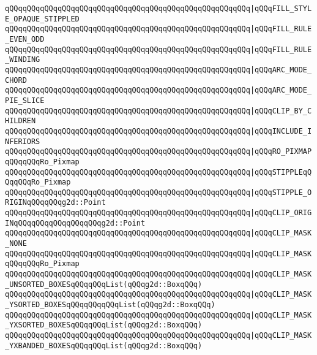 \verb|qQQqqQQqqQQqqQQqqQQqqQQqqQQqqQQqqQQqqQQqqQQqqQQqqQQqqQQq|\verb#|qQQqFILL_STYLE_OPAQUE_STIPPLED#\newline
\verb|qQQqqQQqqQQqqQQqqQQqqQQqqQQqqQQqqQQqqQQqqQQqqQQqqQQqqQQq|\verb#|qQQqFILL_RULE_EVEN_ODD#\newline
\verb|qQQqqQQqqQQqqQQqqQQqqQQqqQQqqQQqqQQqqQQqqQQqqQQqqQQqqQQq|\verb#|qQQqFILL_RULE_WINDING#\newline
\verb|qQQqqQQqqQQqqQQqqQQqqQQqqQQqqQQqqQQqqQQqqQQqqQQqqQQqqQQq|\verb#|qQQqARC_MODE_CHORD#\newline
\verb|qQQqqQQqqQQqqQQqqQQqqQQqqQQqqQQqqQQqqQQqqQQqqQQqqQQqqQQq|\verb#|qQQqARC_MODE_PIE_SLICE#\newline
\verb|qQQqqQQqqQQqqQQqqQQqqQQqqQQqqQQqqQQqqQQqqQQqqQQqqQQqqQQq|\verb#|qQQqCLIP_BY_CHILDREN#\newline
\verb|qQQqqQQqqQQqqQQqqQQqqQQqqQQqqQQqqQQqqQQqqQQqqQQqqQQqqQQq|\verb#|qQQqINCLUDE_INFERIORS#\newline
\verb|qQQqqQQqqQQqqQQqqQQqqQQqqQQqqQQqqQQqqQQqqQQqqQQqqQQqqQQq|\verb#|qQQqRO_PIXMAPqQQqqQQqRo_Pixmap#\newline
\verb|qQQqqQQqqQQqqQQqqQQqqQQqqQQqqQQqqQQqqQQqqQQqqQQqqQQqqQQq|\verb#|qQQqSTIPPLEqQQqqQQqRo_Pixmap#\newline
\verb|qQQqqQQqqQQqqQQqqQQqqQQqqQQqqQQqqQQqqQQqqQQqqQQqqQQqqQQq|\verb#|qQQqSTIPPLE_ORIGINqQQqqQQqg2d::Point#\newline
\verb|qQQqqQQqqQQqqQQqqQQqqQQqqQQqqQQqqQQqqQQqqQQqqQQqqQQqqQQq|\verb#|qQQqCLIP_ORIGINqQQqqQQqqQQqqQQqqQQqg2d::Point#\newline
\verb|qQQqqQQqqQQqqQQqqQQqqQQqqQQqqQQqqQQqqQQqqQQqqQQqqQQqqQQq|\verb#|qQQqCLIP_MASK_NONE#\newline
\verb|qQQqqQQqqQQqqQQqqQQqqQQqqQQqqQQqqQQqqQQqqQQqqQQqqQQqqQQq|\verb#|qQQqCLIP_MASKqQQqqQQqRo_Pixmap#\newline
\verb|qQQqqQQqqQQqqQQqqQQqqQQqqQQqqQQqqQQqqQQqqQQqqQQqqQQqqQQq|\verb#|qQQqCLIP_MASK_UNSORTED_BOXESqQQqqQQqList(qQQqg2d::BoxqQQq)#\newline
\verb|qQQqqQQqqQQqqQQqqQQqqQQqqQQqqQQqqQQqqQQqqQQqqQQqqQQqqQQq|\verb#|qQQqCLIP_MASK_YSORTED_BOXESqQQqqQQqqQQqList(qQQqg2d::BoxqQQq)#\newline
\verb|qQQqqQQqqQQqqQQqqQQqqQQqqQQqqQQqqQQqqQQqqQQqqQQqqQQqqQQq|\verb#|qQQqCLIP_MASK_YXSORTED_BOXESqQQqqQQqList(qQQqg2d::BoxqQQq)#\newline
\verb|qQQqqQQqqQQqqQQqqQQqqQQqqQQqqQQqqQQqqQQqqQQqqQQqqQQqqQQq|\verb#|qQQqCLIP_MASK_YXBANDED_BOXESqQQqqQQqList(qQQqg2d::BoxqQQq)#\newline
